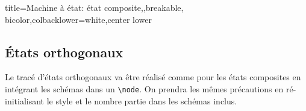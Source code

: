 \documentclass[a4paper,11pt]{article}                      %
\begin{document}
\begin{tcblisting}{title={Machine à état: état composite},,breakable, bicolor,colbacklower=white,center lower}
\newcommand{\composUn}{
\begin{tikzpicture}[remember picture,StmBlocPart=1]
\tikzset{StmBloc/.style={draw, rounded corners=1em, minimum height=10em,
 minimum width=4em, text width=5em,align=center,fill=red!20}}
\node[StmStart](init) at (0,0){};
\node[StmBloc,right=4em of init](etat1){État \\1};
\node[StmBloc,right=4em of etat1](etat2){État\\ 2};
\draw[lien](init) to[bend left] (etat1.180);
\draw[lien] (etat1.20) to[bend left=20]node{trans-1} (etat2.160);
\draw[lien] (etat2.200) to[bend left=20]node{trans-2} (etat1.-20);
\end{tikzpicture}
}

\end{tcblisting}

\subsection{États orthogonaux}

Le tracé d'états orthogonaux va être réalisé comme pour les états composites en intégrant  les schémas dans un \verb!\node!. On prendra les mêmes précautions en ré-initialisant le style et le nombre partie dans les schémas inclus.
\end{document}
